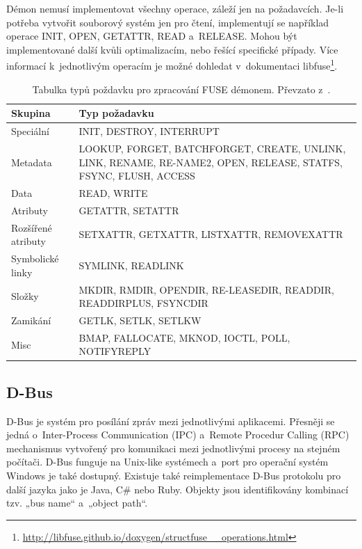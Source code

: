 Démon nemusí implementovat všechny operace, záleží jen na požadavcích. Je-li potřeba vytvořit souborový systém jen pro čtení, implementují se například operace
INIT, OPEN, GETATTR, READ a RELEASE. Mohou být implementované další kvůli optimalizacím, nebo řešící specifické případy. Více informací k jednotlivým operacím
je možné dohledat v dokumentaci libfuse\footnote{\url{http://libfuse.github.io/doxygen/structfuse__operations.html}}.

\begin{table}[h]
    \begin{center}
        \begin{tabularx}{14cm}{|l|X|} 
            \hline
            \textbf{Skupina} & \textbf{Typ požadavku} \\
            \hline
            Speciální & INIT, DESTROY, INTERRUPT \\
            \hline
            Metadata & LOOKUP, FORGET, BATCHFORGET, CREATE, UNLINK, LINK, RENAME, RE-NAME2, OPEN, RELEASE, STATFS, FSYNC, FLUSH, ACCESS \\
            \hline
            Data & READ, WRITE \\
            \hline
            Atributy & GETATTR, SETATTR \\
            \hline
            Rozšířené atributy & SETXATTR, GETXATTR, LISTXATTR, REMOVEXATTR \\
            \hline
            Symbolické linky & SYMLINK, READLINK \\
            \hline
            Složky & MKDIR, RMDIR, OPENDIR, RE-LEASEDIR, READDIR, READDIRPLUS, FSYNCDIR \\
            \hline
            Zamikání & GETLK, SETLK, SETLKW \\
            \hline
            Misc & BMAP, FALLOCATE, MKNOD, IOCTL, POLL, NOTIFYREPLY \\
            \hline
        \end{tabularx}
        \caption{Tabulka typů poždavku pro zpracování FUSE démonem. Převzato z \cite{FuseOrNotToFuse}.}
    \end{center}
\end{table}

\subsection{D-Bus}

D-Bus je systém pro posílání zpráv mezi jednotlivými aplikacemi. Přesněji se jedná o Inter-Process Communication (IPC) a Remote Procedur Calling (RPC) mechanismus
vytvořený pro komunikaci mezi jednotlivými procesy na stejném počítači. D-Bus funguje na Unix-like systémech a port pro operační systém Windows je také dostupný.
Existuje také reimplementace D-Bus protokolu pro další jazyka jako je Java, C\# nebo Ruby. Objekty jsou identifikovány kombinací tzv. „bus name“ a „object path“. \cite{DBus}

